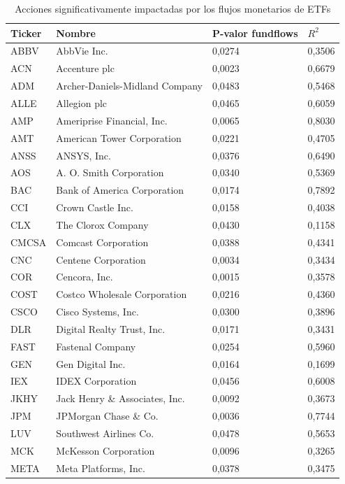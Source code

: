 \documentclass[12pt,a4paper]{article}
\begin{document}
\begin{table}[H]
\centering
\caption{Acciones significativamente impactadas por los flujos monetarios de ETFs}
\label{tab:significant_stocks}
\footnotesize
\begin{tabular}{p{1.5cm}p{6cm}p{2cm}p{1.5cm}}
\toprule
\textbf{Ticker} & \textbf{Nombre} & \textbf{P-valor fundflows} & \textbf{$R^2$} \\
\midrule
ABBV & AbbVie Inc. & 0,0274 & 0,3506 \\
ACN & Accenture plc & 0,0023 & 0,6679 \\
ADM & Archer-Daniels-Midland Company & 0,0483 & 0,5468 \\
ALLE & Allegion plc & 0,0465 & 0,6059 \\
AMP & Ameriprise Financial, Inc. & 0,0065 & 0,8030 \\
AMT & American Tower Corporation & 0,0221 & 0,4705 \\
ANSS & ANSYS, Inc. & 0,0376 & 0,6490 \\
AOS & A. O. Smith Corporation & 0,0340 & 0,5369 \\
BAC & Bank of America Corporation & 0,0174 & 0,7892 \\
CCI & Crown Castle Inc. & 0,0158 & 0,4038 \\
CLX & The Clorox Company & 0,0430 & 0,1158 \\
CMCSA & Comcast Corporation & 0,0388 & 0,4341 \\
CNC & Centene Corporation & 0,0034 & 0,3434 \\
COR & Cencora, Inc. & 0,0015 & 0,3578 \\
COST & Costco Wholesale Corporation & 0,0216 & 0,4360 \\
CSCO & Cisco Systems, Inc. & 0,0300 & 0,3896 \\
DLR & Digital Realty Trust, Inc. & 0,0171 & 0,3431 \\
FAST & Fastenal Company & 0,0254 & 0,5960 \\
GEN & Gen Digital Inc. & 0,0164 & 0,1699 \\
IEX & IDEX Corporation & 0,0456 & 0,6008 \\
JKHY & Jack Henry \& Associates, Inc. & 0,0092 & 0,3673 \\
JPM & JPMorgan Chase \& Co. & 0,0036 & 0,7744 \\
LUV & Southwest Airlines Co. & 0,0478 & 0,5653 \\
MCK & McKesson Corporation & 0,0096 & 0,3265 \\
META & Meta Platforms, Inc. & 0,0378 & 0,3475 \\

\end{tabular}
\end{table}
\end{document}
